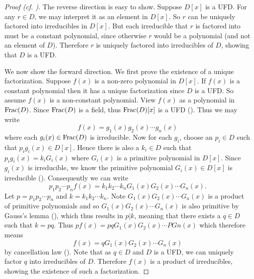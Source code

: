 \begin{proof}[Proof (cf. {\cite[Theorem 18.29]{judson_beezer_2022}})]
    The reverse direction is easy to show. Suppose $D[x]$ is a UFD. For any $r \in D$, we may interpret it as an element in $D[x]$. So $r$ can be uniquely factored into irreducibles in $D[x]$. But each irreducible that $r$ is factored into must be a constant polynomial, since otherwise $r$ would be a polynomial (and not an element of $D$). Therefore $r$ is uniquely factored into irreducibles of $D$, showing that $D$ is a UFD.

    We now show the forward direction. We first prove the existence of a unique factorization. Suppose $f(x)$ is a non-zero polynomial in $D[x]$. If $f(x)$ is a constant polynomial then it has a unique factorization since $D$ is a UFD. So assume $f(x)$ is a non-constant polynomial. View $f(x)$ as a polynomial in $\mathrm{Frac}(D)$. Since $\mathrm{Frac}(D)$ is a field, thus $\mathrm{Frac}(D)[x]$ is a UFD (). Thus we may write
    \[
        f(x) = g_1(x)g_2(x)\cdots g_n(x)
    \]
    where each $g_i(x) \in \mathrm{Frac}(D)$ is irreducible. Now for each $g_i$, choose an $p_i \in D$ such that $p_ig_i(x) \in D[x]$. Hence there is also a $k_i \in D$ such that $p_ig_i(x) = k_iG_i(x)$ where $G_i(x)$ is a primitive polynomial in $D[x]$. Since $g_i(x)$ is irreducible, we know the primitive polynomial $G_i(x) \in D[x]$ is irreducible (). Consequently we can write
    \[
        p_1p_2\cdots p_n f(x) = k_1k_2 \cdots k_n G_1(x)G_2(x) \cdots G_n(x).
    \]
    Let $p = p_1p_2\cdots p_n$ and $k = k_1k_2\cdots k_n$. Note $G_1(x)G_2(x) \cdots G_n(x)$ is a product of primitive polynomials and so $G_1(x)G_2(x) \cdots G_n(x)$ is also primitive by Gauss's lemma (), which thus results in $p \vert k$, meaning that there exists a $q \in D$ such that $k = pq$. Thus $p f(x) = pq G_1(x)G_2(x) \cdots PGn(x)$ which therefore means
    \[
        f(x) = qG_1(x)G_2(x) \cdots G_n(x)
    \]
    by cancellation law (). Note that as $q \in D$ and $D$ is a UFD, we can uniquely factor $q$ into irreducibles of $D$. Therefore $f(x)$ is a product of irreducibles, showing the existence of such a factorization.


\end{proof}
